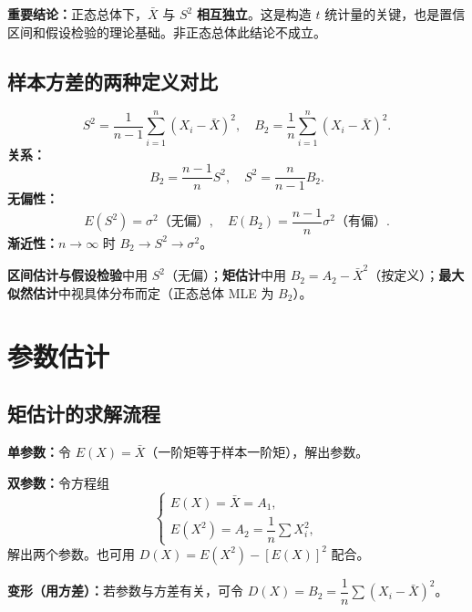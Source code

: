 \documentclass[11pt,a4paper]{article}
\begin{document}
\begin{keypoint}
\textbf{重要结论：}正态总体下，$\bar X$ 与 $S^2$ \textbf{相互独立}。这是构造 $t$ 统计量的关键，也是置信区间和假设检验的理论基础。非正态总体此结论不成立。
\end{keypoint}

\subsection{样本方差的两种定义对比}

\begin{variation}[$S^2$ 与 $B_2$ 的关系]
\[
S^2 = \frac{1}{n-1}\sum_{i=1}^n (X_i-\bar X)^2, \quad B_2 = \frac{1}{n}\sum_{i=1}^n (X_i-\bar X)^2.
\]
\textbf{关系：}
\[
B_2 = \frac{n-1}{n}S^2, \quad S^2 = \frac{n}{n-1}B_2.
\]
\textbf{无偏性：}
\[
E(S^2)=\sigma^2 \text{（无偏）}, \quad E(B_2)=\frac{n-1}{n}\sigma^2 \text{（有偏）}.
\]
\textbf{渐近性：}$n\to\infty$ 时 $B_2\to S^2\to\sigma^2$。
\end{variation}

\begin{examtip}[何时用哪个]
\textbf{区间估计与假设检验}中用 $S^2$（无偏）；\textbf{矩估计}中用 $B_2=A_2-\bar X^2$（按定义）；\textbf{最大似然估计}中视具体分布而定（正态总体 MLE 为 $B_2$）。
\end{examtip}

\section{参数估计}

\subsection{矩估计的求解流程}

\begin{variation}[矩估计的一般步骤]
\textbf{单参数：}令 $E(X)=\bar X$（一阶矩等于样本一阶矩），解出参数。

\textbf{双参数：}令方程组
\[
\begin{cases}
E(X) = \bar X = A_1, \\
E(X^2) = A_2 = \dfrac{1}{n}\sum X_i^2,
\end{cases}
\]
解出两个参数。也可用 $D(X)=E(X^2)-[E(X)]^2$ 配合。

\textbf{变形（用方差）：}若参数与方差有关，可令 $D(X)=B_2=\dfrac{1}{n}\sum(X_i-\bar X)^2$。
\end{variation}
\end{document}
